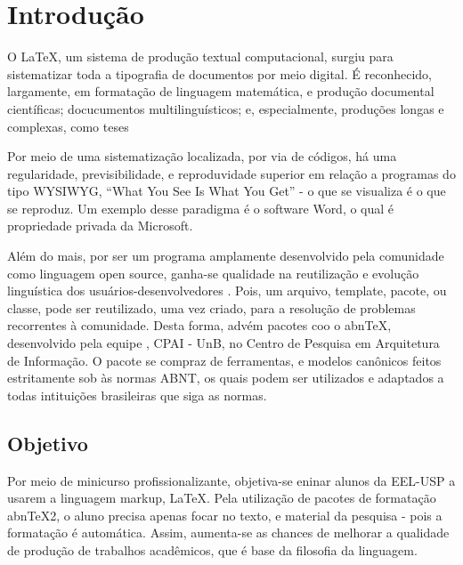 \documentclass[
	12pt,				%
	openright,			%
	oneside,			%
	a4paper,			%
	english,			%
	french,				%
	spanish,			%
	brazil,				%
	]{abntex2}
\begin{document}
\textual

\chapter[Introdução]{Introdução}

O \LaTeX, um sistema de produção textual computacional, surgiu para
sistematizar toda a tipografia de documentos por meio digital. É
reconhecido, largamente, em formatação de linguagem matemática, e
produção documental científicas; docucumentos multilinguísticos; e,
especialmente, produções longas e complexas, como teses
\cite{ignat2005}

Por meio de uma sistematização localizada, por via de códigos, há uma
regularidade, previsibilidade, e reproduvidade superior em relação a
programas do tipo WYSIWYG, ``What You See Is What You Get'' - o que se
visualiza é o que se reproduz. Um exemplo desse paradigma é o software
Word, o qual é propriedade privada da Microsoft.

Além do mais, por ser um programa amplamente desenvolvido pela
comunidade como linguagem open source, ganha-se qualidade na
reutilização e evolução linguística dos usuários-desenvolvedores
\cite{goossens1994}. Pois, um arquivo, template, pacote, ou classe,
pode ser reutilizado, uma vez criado, para a resolução de problemas
recorrentes à comunidade. Desta forma, advém pacotes coo o abnTeX,
desenvolvido pela equipe \abnTeX, CPAI - UnB, no Centro de Pesquisa em
Arquitetura de Informação. O pacote se compraz de ferramentas, e
modelos canônicos feitos estritamente sob às normas ABNT, os quais
podem ser utilizados e adaptados a todas intituições brasileiras que
siga as normas.


\section{Objetivo}

Por meio de minicurso profissionalizante, objetiva-se eninar alunos da
EEL-USP a usarem a linguagem markup, \LaTeX. Pela utilização de
pacotes de formatação abnTeX2, o aluno precisa apenas focar no texto,
e material da pesquisa - pois a formatação é automática. Assim,
aumenta-se as chances de melhorar a qualidade de produção de trabalhos
acadêmicos, que é base da filosofia da linguagem.
\end{document}
